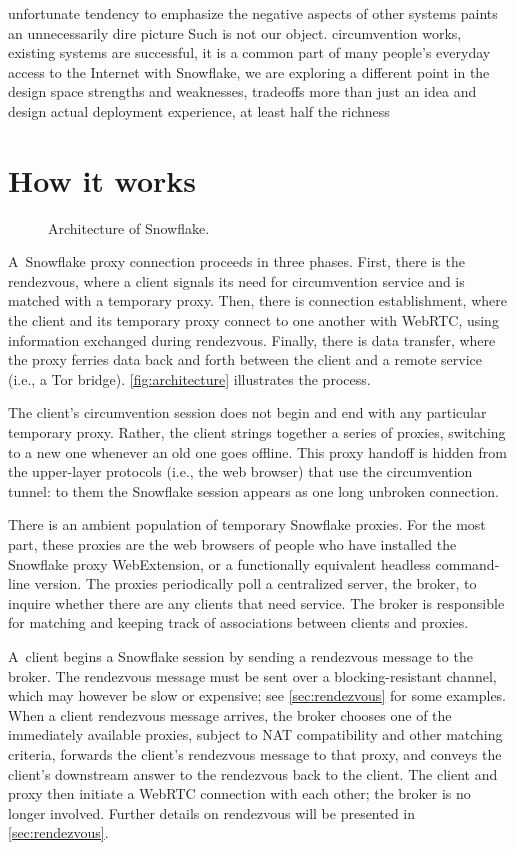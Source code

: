 \documentclass[letterpaper,twocolumn]{article}
\begin{document}
unfortunate tendency to emphasize the negative aspects of other systems
paints an unnecessarily dire picture
Such is not our object.
circumvention works, existing systems are successful,
it is a common part of many people's everyday access to the Internet
with Snowflake, we are exploring a different point in the design space
strengths and weaknesses, tradeoffs
more than just an idea and design
actual deployment experience, at least half the richness

\section{How it works}
\label{sec:mechanics}

\begin{figure}
\caption{
Architecture of Snowflake.
}
\label{fig:architecture}
\end{figure}

A~Snowflake proxy connection proceeds in three phases.
First, there is the rendezvous, where a client
signals its need for circumvention service
and is matched with a temporary proxy.
Then, there is connection establishment,
where the client and its temporary proxy connect to one another
with WebRTC, using information exchanged during rendezvous.
Finally, there is data transfer,
where the proxy ferries data back and forth
between the client and a remote service
(i.e., a Tor bridge).
\autoref{fig:architecture}
illustrates the process.

The client's circumvention session
does not begin and end with any particular temporary proxy.
Rather, the client strings together
a series of proxies, switching to a new one
whenever an old one goes offline.
This proxy handoff is hidden from the upper-layer protocols
(i.e., the web browser) that use the circumvention tunnel:
to them the Snowflake session appears as one long unbroken connection.

There is an ambient population of temporary Snowflake proxies.
For the most part, these proxies are the web browsers of people who have
installed the Snowflake proxy WebExtension,
or a functionally equivalent headless command-line version.
The proxies periodically poll a centralized server, the broker,
to inquire whether there are any clients that need service.
The broker is responsible for matching and
keeping track of associations between clients and proxies.

A~client begins a Snowflake session by
sending a rendezvous message to the broker.
The rendezvous message must be sent over a blocking-resistant channel,
which may however be slow or expensive; see \autoref{sec:rendezvous} for some examples.
When a client rendezvous message arrives,
the broker chooses one of the immediately available proxies,
subject to NAT compatibility and other matching criteria,
forwards the client's rendezvous message to that proxy,
and conveys the client's downstream answer to the rendezvous back to the client.
The client and proxy then initiate a WebRTC connection
with each other; the broker is no longer involved.
Further details on rendezvous will be presented in \autoref{sec:rendezvous}.
\end{document}

